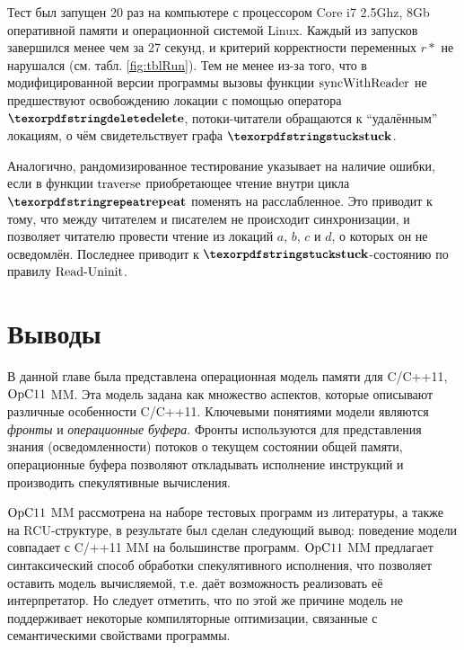 Тест был запущен 20 раз на компьютере с процессором Core i7 2.5Ghz, 8Gb оперативной памяти и операционной системой Linux.
Каждый из запусков завершился менее чем за 27 секунд, и критерий корректности переменных $r*$ не нарушался
(см. табл. \ref{fig:tblRun}). Тем не менее из-за того, что в модифицированной версии программы
вызовы функции ${\rm syncWithReader}$ не предшествуют освобождению
локации с помощью оператора $\kw{delete}$, потоки-читатели
обращаются к ``удалённым'' локациям, о чём свидетельствует графа $\kw{stuck}$.

Аналогично, рандомизированное тестирование указывает на наличие ошибки, если в функции ${\rm traverse}$
приобретающее чтение внутри цикла $\kw{repeat}$ поменять на расслабленное. Это приводит к тому, что между
читателем и писателем не происходит синхронизации, и позволяет читателю провести чтение из локаций $a$, $b$, $c$ и $d$,
о которых он не осведомлён. Последнее приводит к $\kw{stuck}$-состоянию по правилу ${\rm Read\text{-}Uninit}$.

\section{Выводы}
\label{sec:opc11:results}
В данной главе была представлена операционная модель памяти для C/C++11, $\mathrm{OpC11}$ MM.
Эта модель задана как множество аспектов, которые описывают различные особенности
C/C++11.
Ключевыми понятиями модели являются \emph{фронты} и \emph{операционные буфера}.
Фронты используются для представления знания (осведомленности) потоков
о текущем состоянии общей памяти,
операционные буфера позволяют откладывать исполнение инструкций и
производить спекулятивные вычисления.

$\mathrm{OpC11}$ MM рассмотрена на наборе тестовых программ из литературы, а также на RCU-структуре,
в результате был сделан следующий вывод:
поведение модели совпадает с C/++11 MM на большинстве программ.
$\mathrm{OpC11}$ MM предлагает синтаксический способ обработки спекулятивного исполнения, что
позволяет оставить модель вычисляемой, т.е. даёт возможность реализовать её интерпретатор.
Но следует отметить, что по этой же причине модель не поддерживает некоторые компиляторные оптимизации,
связанные с семантическими свойствами программы.
